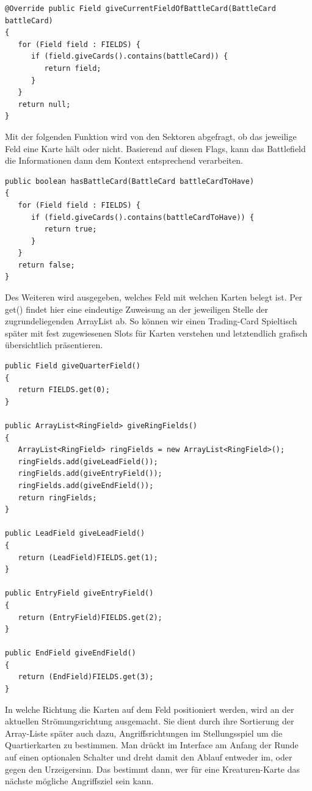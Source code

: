 \begin{lstlisting}
@Override public Field giveCurrentFieldOfBattleCard(BattleCard battleCard)
{
   for (Field field : FIELDS) {
      if (field.giveCards().contains(battleCard)) {
         return field;
      }
   }
   return null;
}
\end{lstlisting}

Mit der folgenden Funktion wird von den Sektoren abgefragt, ob das jeweilige Feld eine Karte hält oder nicht. Basierend auf diesen Flags, kann das Battlefield die Informationen dann dem Kontext entsprechend verarbeiten.

\begin{lstlisting}
public boolean hasBattleCard(BattleCard battleCardToHave)
{
   for (Field field : FIELDS) {
      if (field.giveCards().contains(battleCardToHave)) {
         return true;
      }
   }
   return false;
}
\end{lstlisting}

Des Weiteren wird ausgegeben, welches Feld mit welchen Karten belegt ist. Per get() findet hier eine eindeutige Zuweisung an der jeweiligen Stelle der zugrundeliegenden ArrayList ab. So können wir einen Trading-Card Spieltisch später mit fest zugewiesenen Slots für Karten verstehen und letztendlich grafisch übersichtlich präsentieren.

\begin{lstlisting}
public Field giveQuarterField()
{
   return FIELDS.get(0);
}

public ArrayList<RingField> giveRingFields()
{
   ArrayList<RingField> ringFields = new ArrayList<RingField>();
   ringFields.add(giveLeadField());
   ringFields.add(giveEntryField());
   ringFields.add(giveEndField());
   return ringFields;
}

public LeadField giveLeadField()
{
   return (LeadField)FIELDS.get(1);
}

public EntryField giveEntryField()
{
   return (EntryField)FIELDS.get(2);
}

public EndField giveEndField()
{
   return (EndField)FIELDS.get(3);
}
\end{lstlisting}

In welche Richtung die Karten auf dem Feld positioniert werden, wird an der aktuellen Strömungsrichtung ausgemacht. Sie dient durch ihre Sortierung der Array-Liste später auch dazu, Angriffsrichtungen im Stellungsspiel um die Quartierkarten zu bestimmen.
Man drückt im Interface am Anfang der Runde auf einen optionalen Schalter und dreht damit den Ablauf entweder im, oder gegen den Urzeigersinn. Das bestimmt dann, wer für eine Kreaturen-Karte das nächste mögliche Angriffsziel sein kann.

